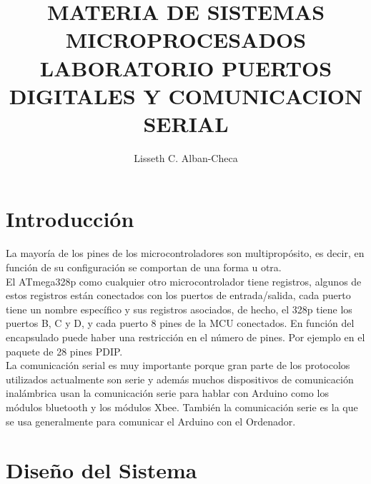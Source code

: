 \documentclass[10pt,a4paper]{article}
\begin{document}
\author{Lisseth C. Alban-Checa} %
\title{MATERIA DE SISTEMAS MICROPROCESADOS\\ %
LABORATORIO PUERTOS DIGITALES Y COMUNICACION SERIAL}
\maketitle  
\section{Introducción} %
\begin{multicols}{2} %
La mayoría de los pines de los microcontroladores son multipropósito, es decir, en función de su configuración se comportan de una forma u otra. \\
El ATmega328p como cualquier otro microcontrolador tiene registros, algunos de estos registros están conectados con los puertos de entrada/salida, cada puerto tiene un nombre específico y sus registros asociados, de hecho, el 328p tiene los puertos B, C y D, y cada puerto 8 pines de la MCU conectados. En función del encapsulado puede haber una restricción en el número de pines. Por ejemplo en el paquete de 28 pines PDIP. \\
La comunicación serial es muy importante porque gran parte de los protocolos utilizados actualmente son serie y además muchos dispositivos de comunicación inalámbrica usan la comunicación serie para hablar con Arduino como los módulos bluetooth y los módulos Xbee. También la comunicación serie es la que se usa generalmente para comunicar el Arduino con el Ordenador.
\end{multicols} %
\section{Diseño del Sistema}
\end{document}
